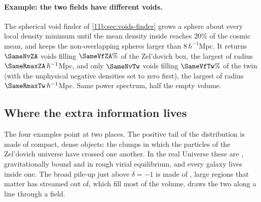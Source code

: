 \paragraph{Example: the two fields have different voids.}
The spherical void finder of \cref{11b:sec:voids-finder} grows a sphere about
every local density minimum until the mean density inside reaches $20\%$ of the
cosmic mean, and keeps the non-overlapping spheres larger than
$8\,h^{-1}$Mpc. It returns $\SameNvZA$ voids filling $\SameVfZA\%$ of the
Zel'dovich box, the largest of radius $\SameRmaxZA\,h^{-1}$Mpc, and only
$\SameNvTw$ voids filling $\SameVfTw\%$ of the twin (with the unphysical
negative densities set to zero first), the largest of radius
$\SameRmaxTw\,h^{-1}$Mpc. Same power spectrum, half the empty volume.

\subsection{Where the extra information lives}
\label{11b:sec:same-where}

The four examples point at two places. The positive tail of the distribution is
made of compact, dense objects: the clumps in which the particles of the
Zel'dovich universe have crossed one another. In the real Universe these are
, gravitationally bound and in rough virial
equilibrium, and every galaxy lives inside one. The broad pile-up just above
$\delta=-1$ is made of , large regions that matter has streamed out
of, which fill most of the volume.  draws the two along a
line through a field.


